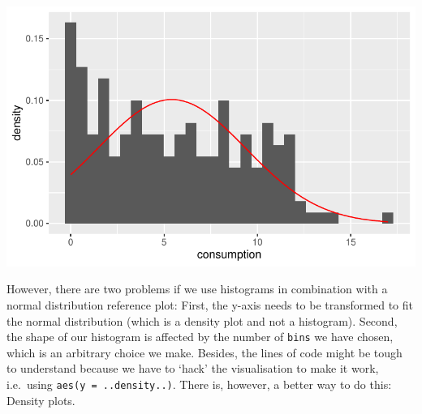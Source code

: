 \documentclass[
  letterpaper,
]{krantz}
\makeatletter
\newenvironment{Shaded}{\begin{snugshade}}{\end{snugshade}}
\newcommand{\AttributeTok}[1]{\textcolor[rgb]{0.40,0.45,0.13}{#1}}
\newcommand{\CommentTok}[1]{\textcolor[rgb]{0.37,0.37,0.37}{#1}}
\newcommand{\DecValTok}[1]{\textcolor[rgb]{0.68,0.00,0.00}{#1}}
\newcommand{\FunctionTok}[1]{\textcolor[rgb]{0.28,0.35,0.67}{#1}}
\newcommand{\NormalTok}[1]{\textcolor[rgb]{0.00,0.23,0.31}{#1}}
\newcommand{\SpecialCharTok}[1]{\textcolor[rgb]{0.37,0.37,0.37}{#1}}
\newcommand{\StringTok}[1]{\textcolor[rgb]{0.13,0.47,0.30}{#1}}
\newenvironment{kframe}{%
\medskip{}
\setlength{\fboxsep}{.8em}
 \def\at@end@of@kframe{}%
 \ifinner\ifhmode%
  \def\at@end@of@kframe{\end{minipage}}%
  \begin{minipage}{\columnwidth}%
 \fi\fi%
 \def\FrameCommand##1{\hskip\@totalleftmargin \hskip-\fboxsep
 \colorbox{shadecolor}{##1}\hskip-\fboxsep
     \hskip-\linewidth \hskip-\@totalleftmargin \hskip\columnwidth}%
 \MakeFramed {\advance\hsize-\width
   \@totalleftmargin\z@ \linewidth\hsize
   \@setminipage}}%
 {\par\unskip\endMakeFramed%
 \at@end@of@kframe}
\renewenvironment{Shaded}{\begin{kframe}}{\end{kframe}}
\makeatother
\begin{document}
\begin{Shaded}
\end{Shaded}

\includegraphics{08_descriptive_statistics_files/figure-latex/compare-normal-distribution-to-our-data-1.pdf}

However, there are two problems if we use histograms in combination with
a normal distribution reference plot: First, the y-axis needs to be
transformed to fit the normal distribution (which is a density plot and
not a histogram). Second, the shape of our histogram is affected by the
number of \texttt{bins} we have chosen, which is an arbitrary choice we
make. Besides, the lines of code might be tough to understand because we
have to `hack' the visualisation to make it work, i.e.~using
\texttt{aes(y\ =\ ..density..)}. There is, however, a better way to do
this: Density plots.
\end{document}
